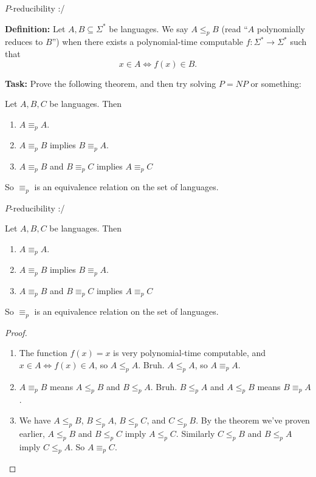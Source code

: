 \documentclass{beamer}
\begin{document}
\begin{frame}{$P$-reducibility :/} 

\textbf{Definition:} Let $A, B \subseteq \Sigma^*$ be languages. We say $A \leq_p B$ (read ``$A$ polynomially reduces to $B$'') when there exists a polynomial-time computable $f: \Sigma^* \to \Sigma^*$ such that
$$x \in A \Leftrightarrow f(x) \in B.$$

\textbf{Task:} Prove the following theorem, and then try solving $P = NP$ or something:
\begin{theorem}
Let $A, B, C$ be languages. Then
\begin{enumerate}
\item $A \equiv_p A$.
\item $A \equiv_p B$ implies $B \equiv_p A$.
\item $A \equiv_p B$ and $B \equiv_p C$ implies $A \equiv_p C$
\end{enumerate}
So $\equiv_p$ is an equivalence relation on the set of languages.
\end{theorem}
\end{frame}

\begin{frame}{$P$-reducibility :/} 
\begin{theorem}
Let $A, B, C$ be languages. Then
\begin{enumerate}
\item $A \equiv_p A$.
\item $A \equiv_p B$ implies $B \equiv_p A$.
\item $A \equiv_p B$ and $B \equiv_p C$ implies $A \equiv_p C$
\end{enumerate}
So $\equiv_p$ is an equivalence relation on the set of languages.
\end{theorem}

\vspace{-4mm}

\begin{proof}
\begin{enumerate}
\item The function $f(x) = x$ is very polynomial-time computable, and $x \in A \Leftrightarrow f(x) \in A$, so $A \leq_p A$. Bruh. $A \leq_p A$, so $A \equiv_p A$.
\item $A \equiv_p B$ means $A \leq_p B$ and $B \leq_p A$. Bruh. $B \leq_p A$ and $A \leq_p B$ means $B \equiv_p A$.
\item We have $A \leq_p B$, $B \leq_p A$, $B \leq_p C$, and $C \leq_p B$. By the theorem we've proven earlier, $A \leq_p B$ and $B \leq_p C$ imply $A \leq_p C$. Similarly $C \leq_p B$ and $B \leq_p A$ imply $C \leq_p A$. So $A \equiv_p C$.

\end{enumerate}
\end{proof}
\end{frame}
\end{document}
